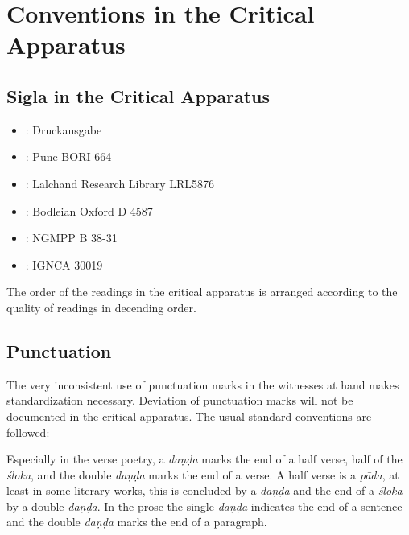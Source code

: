 \documentclass[11pt,showtrims]{memoir}
\begin{document}
\chapter{Conventions in the Critical Apparatus}
\section{Sigla in the Critical Apparatus}
\begin{itemize}
\item \edprint : Druckausgabe
\item \pune : Pune BORI 664
\item \lalchand : Lalchand Research Library LRL5876
\item \oxford : Bodleian Oxford D 4587
\item \nepal : NGMPP B 38-31
\item \unbekannt: IGNCA 30019
\end{itemize}

The order of the readings in the critical apparatus is arranged according to the quality of readings in decending order.  

\section{Punctuation}

The very inconsistent use of punctuation marks in the witnesses at hand makes standardization necessary. Deviation of punctuation marks will not be documented in the critical apparatus. The usual standard conventions are followed:

Especially in the verse poetry, a \textit{daṇḍa} marks the end of a half verse, half of the \textit{śloka}, and the double \textit{daṇḍa} marks the end of a verse. A half verse is a \textit{pāda}, at least in some literary works, this is concluded by a \textit{daṇḍa} and the end of a \textit{śloka} by a double \textit{daṇḍa}. In the prose the single \textit{daṇḍa} indicates the end of a sentence and the double \textit{daṇḍa} marks the end of a paragraph.
\end{document}
